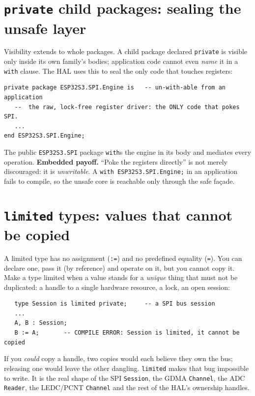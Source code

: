 \section{\texttt{private} child packages: sealing the unsafe layer}

Visibility extends to whole packages. A child package declared \texttt{private} is
visible only inside its own family's bodies; application code cannot even
\emph{name} it in a \texttt{with} clause. The HAL uses this to seal the only code
that touches registers:

\begin{lstlisting}
private package ESP32S3.SPI.Engine is   -- un-with-able from an application
   --  the raw, lock-free register driver: the ONLY code that pokes SPI.
   ...
end ESP32S3.SPI.Engine;
\end{lstlisting}

The public \texttt{ESP32S3.SPI} package \texttt{with}s the engine in its body and
mediates every operation. \textbf{Embedded payoff.} ``Poke the registers
directly'' is not merely discouraged: it is \emph{unwritable}. A
\texttt{with ESP32S3.SPI.Engine;} in an application fails to compile, so the unsafe
core is reachable only through the safe fa\c{c}ade.

\section{\texttt{limited} types: values that cannot be copied}

A limited type has no assignment (\texttt{:=}) and no predefined equality
(\texttt{=}). You can declare one, pass it (by reference) and operate on it, but
you cannot copy it. Make a type limited when a value stands for a \emph{unique}
thing that must not be duplicated: a handle to a single hardware resource, a
lock, an open session:

\begin{lstlisting}
   type Session is limited private;     -- a SPI bus session
   ...
   A, B : Session;
   B := A;       -- COMPILE ERROR: Session is limited, it cannot be copied
\end{lstlisting}

If you \emph{could} copy a handle, two copies would each believe they own the bus;
releasing one would leave the other dangling. \texttt{limited} makes that bug
impossible to write. It is the real shape of the SPI \texttt{Session}, the GDMA
\texttt{Channel}, the ADC \texttt{Reader}, the LEDC/PCNT \texttt{Channel} and the
rest of the HAL's ownership handles.


